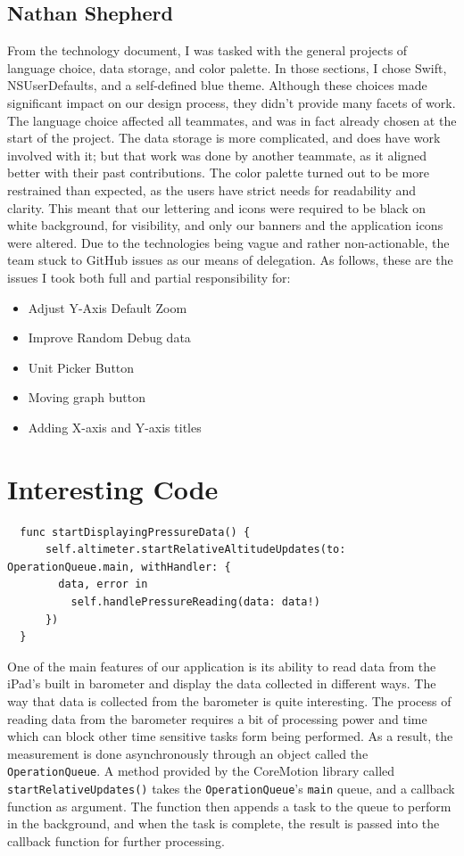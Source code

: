 \documentclass[onecolumn, draftclsnofoot,10pt, compsoc]{IEEEtran}
\begin{document}
\subsection{Nathan Shepherd}
From the technology document, I was tasked with the general projects of language choice, data storage, and color palette.
In those sections, I chose Swift, NSUserDefaults, and a self-defined blue theme.
Although these choices made significant impact on our design process, they didn't provide many facets of work.
The language choice affected all teammates, and was in fact already chosen at the start of the project.
The data storage is more complicated, and does have work involved with it; but that work was done by another teammate, as it aligned better with their past contributions.
The color palette turned out to be more restrained than expected, as the users have strict needs for readability and clarity.
This meant that our lettering and icons were required to be black on white background, for visibility, and only our banners and the application icons were altered.
Due to the technologies being vague and rather non-actionable, the team stuck to GitHub issues as our means of delegation.
As follows, these are the issues I took both full and partial responsibility for:

\begin{itemize}
  \item Adjust Y-Axis Default Zoom
  \item Improve Random Debug data
  \item Unit Picker Button
  \item Moving graph button
  \item Adding X-axis and Y-axis titles
\end{itemize}

\section{Interesting Code}
\begin{lstlisting}
  func startDisplayingPressureData() {
      self.altimeter.startRelativeAltitudeUpdates(to: OperationQueue.main, withHandler: {
        data, error in
          self.handlePressureReading(data: data!)
      })
  }

\end{lstlisting}

One of the main features of our application is its ability to read data from the iPad's built in barometer and display the data collected in different ways.
The way that data is collected from the barometer is quite interesting.
The process of reading data from the barometer requires a bit of processing power and time which can block other time sensitive tasks form being performed.
As a result, the measurement is done asynchronously through an object called the \texttt{OperationQueue}.
A method provided by the CoreMotion library called \texttt{startRelativeUpdates()} takes the \texttt{OperationQueue}'s \texttt{main} queue, and a callback function as argument.
The function then appends a task to the queue to perform in the background, and when the task is complete, the result is passed into the callback function for further processing.\\
\end{document}
